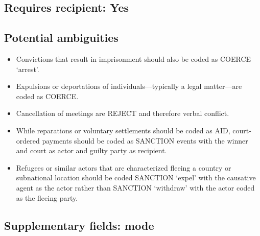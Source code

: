\documentclass[11pt]{report}
\newcommand{\plcat}[1]{\textsf{#1}}
\begin{document}
\subsection{Requires recipient: Yes}

\subsection{Potential ambiguities}

\begin{itemize}
\item Convictions that result in imprisonment should also be coded as \plcat{COERCE} `arrest'.
\item Expulsions or deportations of individuals---typically a legal matter---are coded as \plcat{COERCE}.
\item Cancellation of meetings are \plcat{REJECT} and therefore verbal conflict.
\item While reparations or voluntary settlements should be coded as \plcat{AID}, court-ordered payments should be coded as \plcat{SANCTION} events with the winner and court as actor and guilty party as recipient.
\item Refugees or similar actors that are characterized fleeing a country or subnational location should be coded \plcat{SANCTION} `expel' with the causative agent as the actor rather than \plcat{SANCTION} `withdraw' with the actor coded as the fleeing party.
\end{itemize}

\subsection{Supplementary fields: mode}
\end{document}
